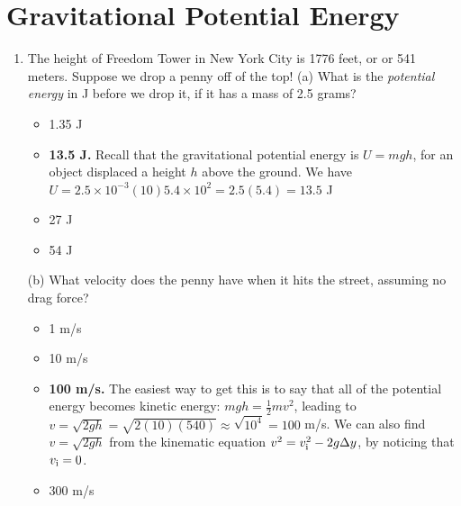 \documentclass[10pt]{article}
\begin{document}
\section{Gravitational Potential Energy}
\begin{enumerate}
\item The height of Freedom Tower in New York City is 1776 feet, or or 541 meters.  Suppose we drop a penny off of the top!  (a) What is the \textit{potential energy} in J before we drop it, if it has a mass of 2.5 grams?
\begin{itemize}
\item 1.35 J
\item \textbf{13.5 J.}  Recall that the gravitational potential energy is $U = mgh$, for an object displaced a height $h$ above the ground.  We have $U = 2.5 \times 10^{-3} (10) 5.4 \times 10^{2} = 2.5(5.4) = 13.5$ J
\item 27 J
\item 54 J
\end{itemize}
(b) What velocity does the penny have when it hits the street, assuming no drag force?
\begin{itemize}
\item 1 m/s
\item 10 m/s
\item \textbf{100 m/s.}  The easiest way to get this is to say that all of the potential energy becomes kinetic energy: $mgh = \frac{1}{2}mv^2$, leading to $v = \sqrt{2gh} = \sqrt{2(10)(540)} \approx \sqrt{10^4} = 100$ m/s.  We can also find $v = \sqrt{2gh}$ from the kinematic equation $v^2 = v_{\rm i}^2 - 2g\Delta y$, by noticing that $v_{\rm i} = 0$.
\item 300 m/s
\end{itemize}
\end{enumerate}
\end{document}
